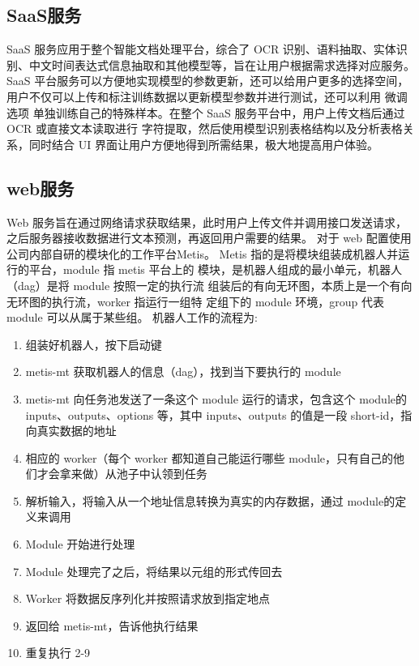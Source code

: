 \subsection{SaaS服务}

SaaS 服务应用于整个智能文档处理平台，综合了 OCR 识别、语料抽取、实体识别、中文时间表达式信息抽取和其他模型等，旨在让用户根据需求选择对应服务。SaaS 平台服务可以方便地实现模型的参数更新，还可以给用户更多的选择空间，
用户不仅可以上传和标注训练数据以更新模型参数并进行测试，还可以利用 微调选项 单独训练自己的特殊样本。在整个 SaaS 服务平台中，用户上传文档后通过 OCR 或直接文本读取进行
字符提取，然后使用模型识别表格结构以及分析表格关系，同时结合 UI 界面让用户方便地得到所需结果，极大地提高用户体验。

\subsection{web服务}

Web 服务旨在通过网络请求获取结果，此时用户上传文件并调用接口发送请求，之后服务器接收数据进行文本预测，再返回用户需要的结果。
对于 web 配置使用公司内部自研的模块化的工作平台Metis。
Metis 指的是将模块组装成机器人并运行的平台，module 指 metis 平台上的
模块，是机器人组成的最小单元，机器人（dag）是将 module 按照一定的执行流
组装后的有向无环图，本质上是一个有向无环图的执行流，worker 指运行一组特
定组下的 module 环境，group 代表 module 可以从属于某些组。
机器人工作的流程为:

\begin{enumerate}
    \item 组装好机器人，按下启动键
    \item metis-mt 获取机器人的信息（dag），找到当下要执行的 module
    \item metis-mt 向任务池发送了一条这个 module 运行的请求，包含这个 module的 inputs、outputs、options 等，其中 inputs、outputs 的值是一段 short-id，指向真实数据的地址
    \item 相应的 worker（每个 worker 都知道自己能运行哪些 module，只有自己的他们才会拿来做）从池子中认领到任务
    \item 解析输入，将输入从一个地址信息转换为真实的内存数据，通过 module的定义来调用
    \item Module 开始进行处理
    \item Module 处理完了之后，将结果以元组的形式传回去
    \item Worker 将数据反序列化并按照请求放到指定地点
    \item 返回给 metis-mt，告诉他执行结果
    \item 重复执行 2-9
\end{enumerate}

